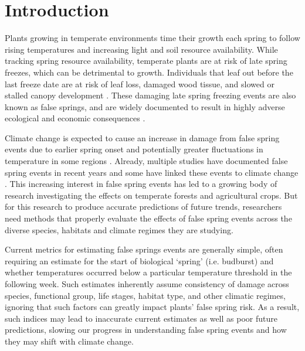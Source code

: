 \documentclass{article}\usepackage[]{graphicx}\usepackage[]{color}
\begin{document}
\section{Introduction}

Plants growing in temperate environments time their growth each spring to follow rising temperatures and increasing light and soil resource availability. While tracking spring resource availability, temperate plants are at risk of late spring freezes, which can be detrimental to growth. Individuals that leaf out before the last freeze date are at risk of leaf loss, damaged wood tissue, and slowed or stalled canopy development \citep{Gu2008, Hufkens2012}. These damaging late spring freezing events are also known as false springs, and are widely documented to result in highly adverse ecological and economic consequences \citep{Knudson2012, Ault2013}.

Climate change is expected to cause an increase in damage from false spring events due to earlier spring onset and potentially greater fluctuations in temperature in some regions \citep{Cannell1986, Inouye2008, Martin2010}. Already, multiple studies have documented false spring events in recent years \citep{Gu2008, Augspurger2009, Knudson2012, Augspurger2013} and some have linked these events to climate change \citep{Ault2013, Allstadt2015, Muffler2016, Xin2016}. This increasing interest in false spring events has led to a growing body of research investigating the effects on temperate forests and agricultural crops. But for this research to produce accurate predictions of future trends, researchers need methods that properly evaluate the effects of false spring events across the diverse species, habitats and climate regimes they are studying. 

Current metrics for estimating false springs events are generally simple, often requiring an estimate for the start of biological `spring' (i.e. budburst) and whether temperatures occurred below a particular temperature threshold in the following week. Such estimates inherently assume consistency of damage across species, functional group, life stages, habitat type, and other climatic regimes, ignoring that such factors can greatly impact plants' false spring risk. As a result, such indices may lead to inaccurate current estimates as well as poor future predictions, slowing our progress in understanding false spring events and how they may shift with climate change. 
\end{document}
